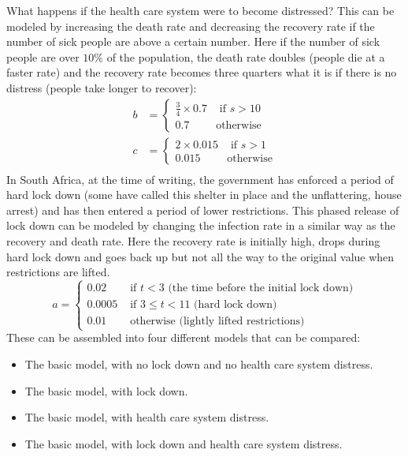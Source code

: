 What happens if the health care system were to become distressed? This can be modeled by increasing the death rate and decreasing the recovery rate if the number of sick people are above a certain number. Here if the number of sick people are over \(10\%\) of the population, the death rate doubles (people die at a faster rate) and the recovery rate becomes three quarters what it is if there is no distress (people take longer to recover):
\[
\begin{split}
b &=
	\begin{cases}
		\frac{3}{4}\times 0.7 & \text{ if }  s > 10\\
		0.7 & \text{otherwise}
	\end{cases}\\
c &=
	\begin{cases}
	2\times 0.015 & \text{ if }  s > 1\\
	0.015 & \text{otherwise}
	\end{cases}\\
\end{split}
\]
In South Africa, at the time of writing, the government has enforced a period of hard lock down (some have called this shelter in place and the unflattering, house arrest) and has then entered a period of lower restrictions. This phased release of lock down can be modeled by changing the infection rate in a similar way as the recovery and death rate. Here the recovery rate is initially high, drops during hard lock down and goes back up but not all the way to the original value when restrictions are lifted.
\[
a = \begin{cases}
0.02& \text{ if } t < 3 \text{ (the time before the initial lock down)}\\
0.0005& \text{ if } 3 \leq t < 11 \text{ (hard lock down)}\\
0.01& \text{ otherwise (lightly lifted restrictions)}
\end{cases}
\]
These can be assembled into four different models that can be compared:
\begin{itemize}
	\item The basic model, with no lock down and no health care system distress.
	\item The basic model, with lock down.
	\item The basic model, with health care system distress.
	\item The basic model, with lock down and health care system distress.
\end{itemize}